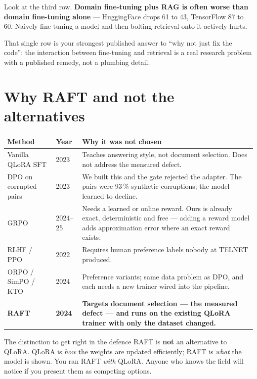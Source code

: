 \documentclass[11pt,a4paper]{article}
\begin{document}
Look at the third row. \textbf{Domain fine-tuning plus RAG is often worse than
domain fine-tuning alone} --- HuggingFace drops 61 to 43, TensorFlow 87 to 60.
Naively fine-tuning a model and then bolting retrieval onto it actively hurts.

That single row is your strongest published answer to ``why not just fix the
code'': the interaction between fine-tuning and retrieval is a real research
problem with a published remedy, not a plumbing detail.

\section{Why RAFT and not the alternatives}

\begin{table}[h]\centering\small
\begin{tabularx}{\textwidth}{l l Y}
\toprule
\textbf{Method} & \textbf{Year} & \textbf{Why it was not chosen} \\
\midrule
Vanilla QLoRA SFT & 2023 & Teaches answering style, not document selection. Does not
address the measured defect. \\
 DPO on corrupted pairs & 2023 & We built this and the gate rejected the adapter.
The pairs were 93\,\% synthetic corruptions; the model learned to decline. \\
GRPO & 2024--25 & Needs a learned or online reward. Ours is already exact,
deterministic and free --- adding a reward model adds approximation error where an
exact reward exists. \\
 RLHF / PPO & 2022 & Requires human preference labels nobody at TELNET produced. \\
ORPO / SimPO / KTO & 2024 & Preference variants; same data problem as DPO, and each
needs a new trainer wired into the pipeline. \\
\textbf{RAFT} & \textbf{2024} & \textbf{Targets document selection --- the measured
defect --- and runs on the existing QLoRA trainer with only the dataset changed.} \\
\bottomrule
\end{tabularx}
\end{table}

\begin{keybox}{The distinction to get right in the defence}
RAFT is \textbf{not} an alternative to QLoRA. QLoRA is \emph{how} the weights are
updated efficiently; RAFT is \emph{what} the model is shown. You ran RAFT
\emph{with} QLoRA. Anyone who knows the field will notice if you present them as
competing options.
\end{keybox}
\end{document}
